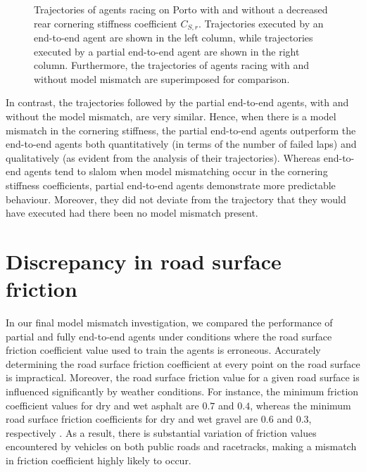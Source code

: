 \begin{figure}[htb!]
    \centering
    
    \caption[Trajectories of agents racing with and without a decreased rear cornering stiffness coefficient]{Trajectories of agents racing on Porto with and without a decreased rear cornering stiffness coefficient $C_{S,r}$. Trajectories executed by an end-to-end agent are shown in the left column, while trajectories executed by a partial end-to-end agent are shown in the right column. Furthermore, the trajectories of agents racing with and without model mismatch are superimposed for comparison.}
    \label{fig:c_sr}
\end{figure}

In contrast, the trajectories followed by the partial end-to-end agents, with and without the model mismatch, are very similar.
Hence, when there is a model mismatch in the cornering stiffness, the partial end-to-end agents outperform the end-to-end agents both quantitatively (in terms of the number of failed laps) and qualitatively (as evident from the analysis of their trajectories).
Whereas end-to-end agents tend to slalom when model mismatching occur in the cornering stiffness coefficients, partial end-to-end agents demonstrate more predictable behaviour.
Moreover, they did not deviate from the trajectory that they would have executed had there been no model mismatch present.


\section{Discrepancy in road surface friction}

In our final model mismatch investigation, we compared the performance of partial and fully end-to-end agents under conditions where the road surface friction coefficient value used to train the agents is erroneous.
Accurately determining the road surface friction coefficient at every point on the road surface is impractical.
Moreover, the road surface friction value for a given road surface is influenced significantly by weather conditions.
For instance, the minimum friction coefficient values for dry and wet asphalt are $0.7$ and $0.4$, whereas the minimum road surface friction coefficients for dry and wet gravel are $0.6$ and $0.3$, respectively \cite{Novikov2018}. 
As a result, there is substantial variation of friction values encountered by vehicles on both public roads and racetracks, making a mismatch in friction coefficient highly likely to occur.

